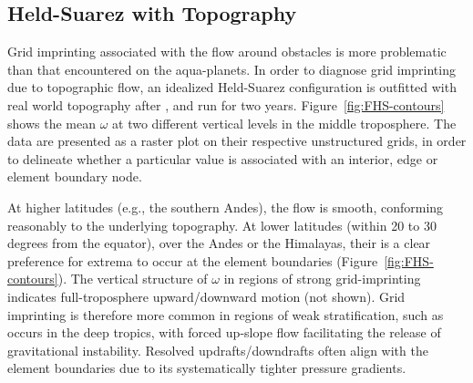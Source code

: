 \documentclass[twocol]{ametsoc}
\begin{document}
\subsection{{\color{red}Held-Suarez with Topography{}}}

Grid imprinting associated with the flow around obstacles is more problematic than that encountered on the aqua-planets. In order to diagnose grid imprinting due to topographic flow, an idealized Held-Suarez configuration \citep{HS1994} is outfitted with real world topography after \cite{FRETAL2000WMR,BETAL2006MWR}, and run for two years. Figure~\ref{fig:FHS-contours} shows the mean $\omega$ at two different vertical levels in the middle troposphere. {\color{red}The data are presented as a raster plot on their respective unstructured grids, in order to delineate whether a particular value is associated with an interior, edge or element boundary node.{}} 

At higher latitudes (e.g., the southern Andes), the flow is smooth, conforming reasonably to the underlying topography. At lower latitudes (within 20 to 30 degrees from the equator), over the Andes or the Himalayas, their is a clear preference for extrema to occur at the element boundaries (Figure~\ref{fig:FHS-contours}). The vertical structure of $\omega$ in regions of strong grid-imprinting indicates full-troposphere upward/downward motion (not shown). Grid imprinting is therefore more common in regions of weak stratification, such as occurs in the deep tropics, with forced up-slope flow facilitating the release of gravitational instability. Resolved updrafts/downdrafts often align with the element boundaries due to its systematically tighter pressure gradients. 
\end{document}
